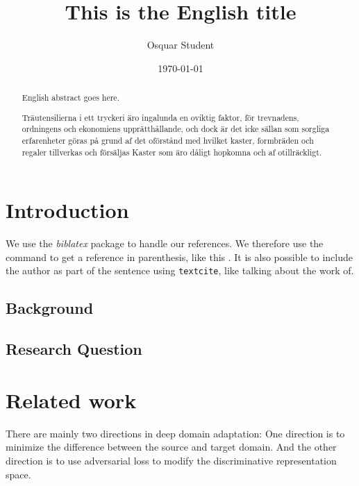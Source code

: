 \documentclass{kththesis}
\title{This is the English title}
\author{Osquar Student}
\date{\today}
\begin{document}
\frontmatter

\titlepage

\begin{abstract}
  English abstract goes here.

  \blindtext
\end{abstract}


\begin{otherlanguage}{swedish}
  \begin{abstract}
    Träutensilierna i ett tryckeri äro ingalunda en oviktig faktor,
    för trevnadens, ordningens och ekonomiens upprätthållande, och
    dock är det icke sällan som sorgliga erfarenheter göras på grund
    af det oförstånd med hvilket kaster, formbräden och regaler
    tillverkas och försäljas Kaster som äro dåligt hopkomna och af
    otillräckligt.
  \end{abstract}
\end{otherlanguage}


\tableofcontents


\mainmatter


\chapter{Introduction}

We use the \emph{biblatex} package to handle our references.  We therefore use the
command  to get a reference in parenthesis, like this
\parencite{heisenberg2015}.  It is also possible to include the author
as part of the sentence using \texttt{textcite}, like talking about
the work of.

\Blindtext
\section{Background}

\section{Research Question}


\chapter{Related work}

There are mainly two directions in deep domain adaptation:
One direction is to minimize the difference between the source and target domain. And the other direction is to use adversarial loss to modify the discriminative representation space. 
\end{document}
